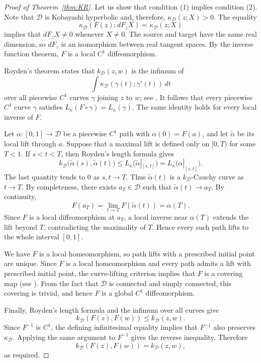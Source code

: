 \documentclass[12pt]{amsart}
\newcommand{\D}{\mathcal D}
\newcommand{\kD}{k_{\D}}
\newcommand{\kapD}{\kappa_{\D}}
\begin{document}
\begin{proof}[Proof of Theorem~\ref{thm:KR}]
Let us show that condition {\rm (1)} implies condition
{\rm (2)}. Note that $\D$ is Kobayashi hyperbolic and, therefore,
$\kapD(z;X)>0$. The equality
\[
\kapD(F(z);dF_zX)=\kapD(z;X)
\]
implies that $dF_zX\neq0$ whenever $X\neq0$. The source and target have the same real dimension, so $dF_z$ is an
isomorphism between real tangent spaces. By the inverse
function theorem, $F$ is a local $C^1$ diffeomorphism.

Royden's theorem states that $\kD(z,w)$ is the infimum of
\[
\int \kapD(\gamma(t);\gamma'(t))\,dt
\]
over all piecewise $C^1$ curves $\gamma$ joining $z$ to $w$; see
\cite{Royden,JP}. It follows that every piecewise $C^1$ curve $\gamma$
satisfies $L_\kappa(F\circ\gamma)=L_\kappa(\gamma)$.
The same identity holds for every local inverse of $F$.

Let
$\alpha:[0,1]\to\D$ be a piecewise $C^1$ path with
$\alpha(0)=F(a)$, and let $\widetilde\alpha$ be its local lift through $a$. Suppose that a maximal lift is defined only on $[0,T)$ for some
$T<1$. If $s<t<T$, then Royden's length formula gives
\[
\kD\bigl(\widetilde\alpha(s),\widetilde\alpha(t)\bigr)
\leq
L_\kappa\bigl(\widetilde\alpha|_{[s,t]}\bigr)
=
L_\kappa\bigl(\alpha|_{[s,t]}\bigr).
\]
The last quantity tends to $0$ as $s,t\to T$. Thus
$\widetilde\alpha(t)$ is a $\kD$-Cauchy curve as $t\to T$.
By completeness, there exists $a_T\in\D$ such that
$\widetilde\alpha(t)\to a_T$. By continuity,
\[
F(a_T)
=
\lim_{t\to T}F(\widetilde\alpha(t))
=
\alpha(T).
\]
Since $F$ is a local diffeomorphism at $a_T$, a local inverse near
$\alpha(T)$ extends the lift beyond $T$, contradicting the maximality
of $T$. Hence every such path lifts to the whole interval $[0,1]$.

We have $F$ is a local homeomorphism, so path lifts with a prescribed initial point are unique.  Since $F$ is a local homeomorphism and every path admits a lift with prescribed initial point, the curve-lifting criterion implies that $F$ is a covering map (see 
\cite[Theorem 4.19]{Forster}).
From the fact that $\D$ is connected and simply connected, this covering is trivial, and hence $F$ is a global $C^1$ diffeomorphism.

Finally, Royden's length formula and the infimum over all curves give
\[
\kD(F(z),F(w))\leq\kD(z,w).
\]
Since $F^{-1}$ is $C^1$, the defining infinitesimal equality implies
that $F^{-1}$ also preserves $\kapD$. Applying the same argument to
$F^{-1}$ gives the reverse inequality. Therefore
\[
\kD(F(z),F(w))=\kD(z,w),
\]
as required.


\end{proof}
\end{document}
